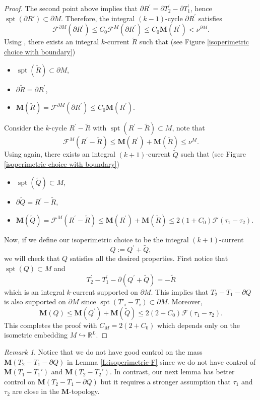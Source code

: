 \documentclass[10pt]{amsart}
\theoremstyle{definition}
\theoremstyle{remark}
\newtheorem{remark}[theorem]{Remark}
\numberwithin{equation}{section}
\newcommand{\R}{\mathbb{R}}
\newcommand{\F}{\mathcal{F}}
\newcommand{\pr}{\prime}
\newcommand{\ti}{\tilde}
\newcommand{\M}{\mathbf{M}}
\newcommand{\spt}{\operatorname{spt}}
\begin{document}
\begin{proof}
The second point above implies that $\partial R^{\pr}=\partial T^{\pr}_2-\partial T^{\pr}_1$, hence $\spt(\partial R') \subset \partial M$.  Therefore, the integral $(k-1)$-cycle $\partial R^{\pr}$ satisfies
$$\F^{\partial M}(\partial R^{\pr})\leq C_0\F^M(\partial R^{\pr})\leq C_0 \M(R^{\pr})<\nu^{\partial M}.$$
Using \cite[Corollary 1.14]{Almgren62}, there exists an integral $k$-current $\ti{R}$ such that (see Figure \ref{isoperimetric choice with boundary})
\begin{itemize}
\item $\spt(\ti{R}) \subset \partial M$,
\item $\partial \ti{R}=\partial R^{\pr}$,
\item $\M(\ti{R})=\F^{\partial M}(\partial R^{\pr})\leq C_0\M(R^{\pr}).$
\end{itemize}
Consider the $k$-cycle $R^{\pr}-\ti{R}$ with $\spt(R^{\pr}-\ti{R}) \subset M$, note that
$$\F^M(R^{\pr}-\ti{R})\leq \M(R^{\pr})+\M(\ti{R})
\leq \nu^M.$$
Using \cite[Corollary 1.14]{Almgren62} again, there exists an integral $(k+1)$-current $\ti{Q}$ such that (see Figure \ref{isoperimetric choice with boundary})
\begin{itemize}
\item $\spt(\ti{Q}) \subset M$,
\item $\partial \ti{Q}=R^{\pr}-\ti{R}$,
\item $\M(\ti{Q})=\F^M(R^{\pr}-\ti{R})\leq \M(R^{\pr})+\M(\ti{R})\leq 2(1+C_0)\F(\tau_1- \tau_2)$.
\end{itemize}
Now, if we define our isoperimetric choice to be the integral $(k+1)$-current
\[ Q:=Q^{\pr}+\ti{Q},\]
we will check that $Q$ satisfies all the desired properties. First notice that $\spt(Q) \subset M$ and
\[ T^{\pr}_2-T^{\pr}_1-\partial (Q^{\pr}+\ti{Q})=-\ti{R}\]
which is an integral $k$-current supported on $\partial M$. 
This implies that $T_2-T_1-\partial Q$ is also supported on $\partial M$ since $\spt(T'_i-T_i) \subset \partial M$. Moreover, 
\[ \M(Q)\leq \M(Q^{\pr})+\M(\ti{Q})\leq 2(2+C_0)\F (\tau_1- \tau_2).\]
This completes the proof with $C_M=2(2+C_0)$ which depends only on the isometric embedding $M \hookrightarrow \R^L$.
\end{proof}


\begin{remark}
Notice that we do not have good control on  the mass $\M(T_2-T_1-\partial Q)$ in Lemma \ref{L:isoperimetric-F} since we do not have control of $\M(T_1-T_1')$ and $\M(T_2-T_2')$. In contrast, our next lemma has better control on $\M(T_2-T_1-\partial Q)$ but it requires a stronger assumption that $\tau_1$ and $\tau_2$ are close in the $\M$-topology.
\end{remark}
\end{document}
